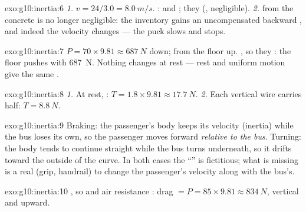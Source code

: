 \begin{solution}{exo:g10:inertia:6}
\emph{1.} $v = 24/3.0 = \qty{8.0}{m/s}$. :  and ; they  (, 
negligible). \emph{2.}  from the concrete is no longer
negligible: the inventory gains an uncompensated backward , and
indeed the velocity changes --- the puck slows and stops.
\end{solution}

\begin{solution}{exo:g10:inertia:7}
 $P = 70 \times 9.81 \approx \qty{687}{N}$ down;  from the
floor up. , so they : the floor pushes
with \qty{687}{N}. Nothing changes at rest --- rest and uniform motion
give the same .
\end{solution}

\begin{solution}{exo:g10:inertia:8}
\emph{1.} At rest,   :
$T = 1.8 \times 9.81 \approx \qty{17.7}{N}$. \emph{2.} Each vertical
wire carries half: $T = \qty{8.8}{N}$.
\end{solution}

\begin{solution}{exo:g10:inertia:9}
Braking: the passenger's body keeps its velocity (inertia) while the
bus loses its own, so the passenger moves forward \emph{relative to the
bus}. Turning: the body tends to continue straight while the bus turns
underneath, so it drifts toward the outside of the curve. In both
cases the ``'' is fictitious; what is missing is a real 
(grip, handrail) to change the passenger's velocity along with the
bus's.
\end{solution}

\begin{solution}{exo:g10:inertia:10}
, so  and air resistance : drag
$= P = 85 \times 9.81 \approx \qty{834}{N}$, vertical and upward.
\end{solution}

